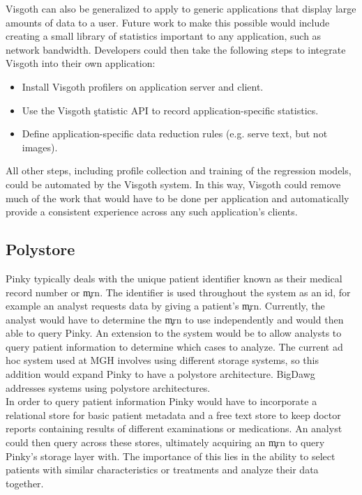 Visgoth can also be generalized to apply to generic applications that display
large amounts of data to a user. Future work to make this possible would
include creating a small library of statistics important to any application,
such as network bandwidth. Developers could then take the following steps to
integrate Visgoth into their own application:

\begin{itemize}
  \item Install Visgoth profilers on application server and client.
  \item Use the Visgoth \c{statistic} API to record application-specific
    statistics.
  \item Define application-specific data reduction rules (e.g. serve text, but
    not images).
\end{itemize}

All other steps, including profile collection and training of the regression
models, could be automated by the Visgoth system. In this way, Visgoth could
remove much of the work that would have to be done per application and
automatically provide a consistent experience across any such application's
clients.

\subsection{Polystore}

Pinky typically deals with the unique patient identifier known as their medical
record number or \c{mrn}. The identifier is used throughout the system as an
id, for example an analyst requests data by giving a patient's \c{mrn}.
Currently, the analyst would have to determine the \c{mrn} to use independently
and would then able to query Pinky. An extension to the system would be to
allow analysts to query patient information to determine which cases to
analyze. The current ad hoc system used at MGH involves using different storage
systems, so this addition would expand Pinky to have a polystore architecture.
BigDawg \cite{bigdawg} addresses systems using polystore architectures. \\

In order to query patient information Pinky would have to incorporate a
relational store for basic patient metadata and a free text store to keep
doctor reports containing results of different examinations or medications. An
analyst could then query across these stores, ultimately acquiring an \c{mrn}
to query Pinky's storage layer with. The importance of this lies in the ability
to select patients with similar characteristics or treatments and analyze their
data together.

